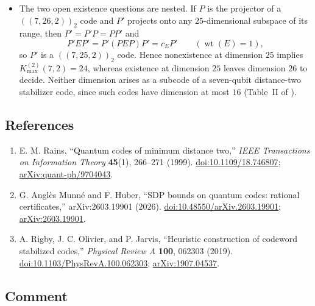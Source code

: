 \begin{itemize}
  \item The two open existence questions are nested.  If $P$ is the projector of a
  $((7,26,2))_2$ code and $P'$ projects onto any $25$-dimensional subspace of its
  range, then $P'=P'P=PP'$ and
  \begin{equation}
    P'EP'=P'(PEP)P'=c_EP'
    \qquad(\operatorname{wt}(E)=1),
    \label{eq:5ea7-subcode}
  \end{equation}
  so $P'$ is a $((7,25,2))_2$ code.  Hence nonexistence at dimension $25$ implies
  $K_{\max}^{(2)}(7,2)=24$, whereas existence at dimension $25$ leaves dimension
  $26$ to decide.  Neither dimension arises as a subcode of a seven-qubit
  distance-two stabilizer code, since such codes have dimension at most $16$
  (Table~II of ).
\end{itemize}

\subsection*{References}

\begin{enumerate}[label={},leftmargin=4.8em,labelsep=0.5em]
  \footnotesize
  \item[\textup{[Rai99]}]\label{ref:5ea7-rains}
  E. M. Rains, ``Quantum codes of minimum distance two,'' \emph{IEEE Transactions on Information Theory} \textbf{45}(1), 266--271 (1999). \href{https://doi.org/10.1109/18.746807}{doi:10.1109/18.746807}; \href{https://arxiv.org/abs/quant-ph/9704043}{arXiv:quant-ph/9704043}.

  \item[\textup{[AMH26]}]\label{ref:5ea7-amh}
  G. Angl\`es Munn\'e and F. Huber, ``SDP bounds on quantum codes: rational certificates,'' arXiv:2603.19901 (2026). \href{https://doi.org/10.48550/arXiv.2603.19901}{doi:10.48550/arXiv.2603.19901}; \href{https://arxiv.org/abs/2603.19901}{arXiv:2603.19901}.

  \item[\textup{[ROJ19]}]\label{ref:5ea7-roj}
  A. Rigby, J. C. Olivier, and P. Jarvis, ``Heuristic construction of codeword stabilized codes,'' \emph{Physical Review A} \textbf{100}, 062303 (2019). \href{https://doi.org/10.1103/PhysRevA.100.062303}{doi:10.1103/PhysRevA.100.062303}; \href{https://arxiv.org/abs/1907.04537}{arXiv:1907.04537}.
\end{enumerate}

\subsection*{Comment}

